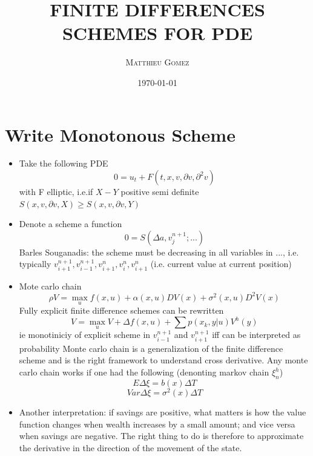 \documentclass[english]{article}
\begin{document}
\title{\vspace{-4.5ex} \large{\textbf{\MakeUppercase{Finite Differences Schemes for PDE}}}\vspace{1ex}}
\author{\large{\textsc{Matthieu Gomez}}}
\date{\today}
\maketitle
\tableofcontents
\newpage



\section{Write Monotonous Scheme}
\begin{itemize}
	\item 
	Take the following PDE
	$$0 = u_t + F(t, x, v, \partial v, \partial^2 v)$$
	with F elliptic, i.e.if $X - Y$ positive semi definite
	$S(x, v, \partial v, X) \geq S(x, v, \partial v, Y)$
	\item 
	Denote a scheme a function 
	$$0 = S(\Delta a, v_j^{n+1} ; ...)$$
	Barles Souganadis: the scheme must be decreasing in all variables in ..., i.e.  typically $v_{i+1}^{n+1}, v_{i-1}^{n+1}, v_{i+1}^{n}, v_{i}^{n}, v_{i+1}^{n}$  (i.e. current value at current position)
	\item Mote carlo chain
	$$\rho V = \max_{u} f(x, u) + \alpha(x, u) DV(x) + \sigma^2(x, u) D^2 V(x)$$
	Fully explicit finite difference schemes can be rewritten
	$$V = \max_{u} V + \Delta f(x, u) + \sum p(x_k, y|u)V^h(y) $$
	ie monotiniciy of explicit scheme in $v_{i-1}^{n+1}$ and $v_{i+1}^{n+1}$ iff can be interpreted as probability
	Monte carlo chain is a generalization of the finite difference scheme and is the right framework to understand cross derivative.
	Any monte carlo chain works if one had the following (denonting markov chain $\xi^h_n$)
	$$E\Delta \xi = b(x) \Delta T$$
	$$Var\Delta \xi = \sigma^2 (x) \Delta T$$
	\item  Another interpretation: if savings are positive, what matters is how the value function changes when wealth increases by a small amount; and vice versa when savings are negative. The right thing to do is therefore to approximate the derivative in the direction of the movement of the state.
\end{itemize}
\end{document}
